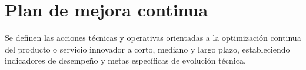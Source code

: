 \section{Plan de mejora continua}
\label{sec:plan_mejora}

Se definen las acciones técnicas y operativas orientadas a la optimización continua del producto o servicio innovador a corto, mediano y largo plazo, estableciendo indicadores de desempeño y metas específicas de evolución técnica.



